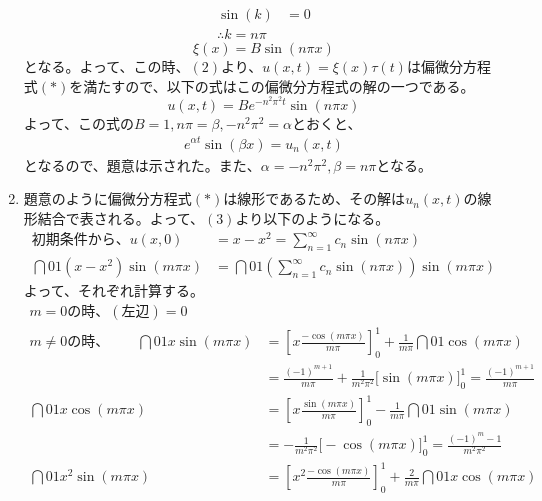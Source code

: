 \begin{enumerate}[(1)]
        \begin{align*}
            \sin (k) &= 0\\
            \therefore k = n\pi
        \end{align*}
        \begin{equation*}
            \xi (x) = B\sin (n\pi x)
        \end{equation*}
        となる。よって、この時、$(2)$より、$u(x, t) = \xi (x)\tau (t)$は偏微分方程式$(*)$を満たすので、以下の式はこの偏微分方程式の解の一つである。
        \begin{equation*}
            u(x, t) = Be^{-n^2\pi^2t}\sin(n\pi x)
        \end{equation*}
        よって、この式の$B = 1, n\pi = \beta, -n^2\pi^2 = \alpha$とおくと、
        \begin{align*}
            e^{\alpha t}\sin(\beta x) = u_n(x, t)
        \end{align*}
        となるので、題意は示された。また、$\alpha = -n^2\pi^2, \beta = n\pi$となる。
    \item 題意のように偏微分方程式$(*)$は線形であるため、その解は$u_n(x, t)$の線形結合で表される。よって、$(3)$より以下のようになる。
    \begin{align*}
        初期条件から、u(x, 0) &= x - x^2 = \sum_{n = 1}^{\infty}c_n\sin(n\pi x)\\
        \dint{0}{1}{(x - x^2)\sin(m\pi x)} &= \dint{0}{1}{\left(\sum_{n = 1}^{\infty}c_n\sin(n\pi x)\right)\sin (m\pi x)}
    \end{align*}
    よって、それぞれ計算する。
    \begin{align*}
        m = 0の時、
        (左辺) = 0&\\
        m \neq 0の時、\qquad
        \dint{0}{1}{x\sin(m\pi x)} &= \left[x\frac{-\cos(m\pi x)}{m\pi}\right]_{0}^{1} + \frac{1}{m\pi}\dint{0}{1}{\cos(m\pi x)}\\
        &= \frac{(-1)^{m + 1}}{m\pi} + \frac{1}{m^2\pi^2}\bigl[\sin (m\pi x)\bigr]_{0}^{1} = \frac{(-1)^{m + 1}}{m\pi}\\
        \dint{0}{1}{x\cos(m\pi x)} &= \left[x\frac{\sin(m\pi x)}{m\pi}\right]_{0}^{1} - \frac{1}{m\pi}\dint{0}{1}{\sin(m\pi x)}\\
        &= -\frac{1}{m^2\pi^2}\bigl[-\cos (m\pi x)\bigr]_{0}^{1} = \frac{(-1)^{m} - 1}{m^2\pi^2}\\
        \dint{0}{1}{x^2\sin(m\pi x)} &= \left[x^2\frac{-\cos(m\pi x)}{m\pi}\right]_{0}^{1} + \frac{2}{m\pi}\dint{0}{1}{x\cos(m\pi x)}\\

\end{align*}
\end{enumerate}
